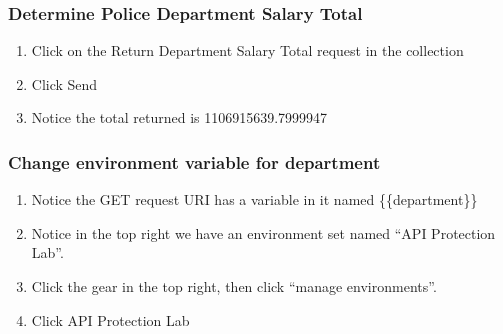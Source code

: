 \documentclass[letterpaper,10pt,english]{sphinxmanual}
\begin{document}
\subsubsection{Determine Police Department Salary Total}
\label{\detokenize{class1/module1/module1:determine-police-department-salary-total}}\begin{enumerate}
\item {} 
Click on the Return Department Salary Total request in the collection

\item {} 
Click Send

\item {} 
Notice the total returned is 1106915639.7999947

\end{enumerate}


\subsubsection{Change environment variable for department}
\label{\detokenize{class1/module1/module1:change-environment-variable-for-department}}\begin{enumerate}
\item {} 
Notice the GET request URI has a variable in it named \{\{department\}\}

\end{enumerate}
\begin{quote}

\noindent{}
\end{quote}
\begin{enumerate}
\setcounter{enumi}{1}
\item {} 
Notice in the top right we have an environment set named “API
Protection Lab”.

\item {} 
Click the gear in the top right, then click “manage environments”.

\end{enumerate}
\begin{quote}

\noindent{}
\end{quote}
\begin{enumerate}
\setcounter{enumi}{3}
\item {} 
Click API Protection Lab

\end{enumerate}
\begin{quote}

\noindent{}
\end{quote}
\end{document}
